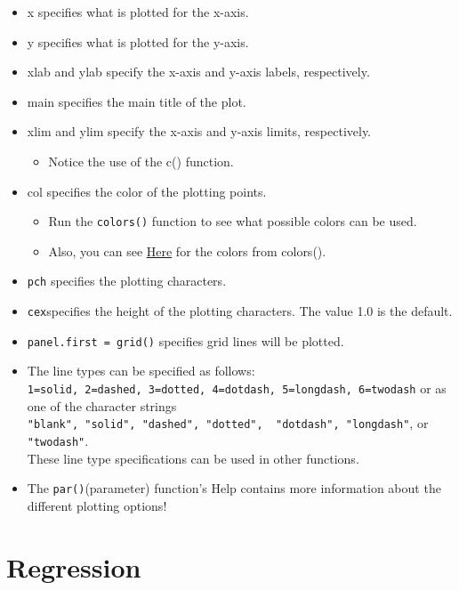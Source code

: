 \documentclass[
]{book}
\providecommand{\tightlist}{%
  \setlength{\itemsep}{0pt}\setlength{\parskip}{0pt}}
\begin{document}
\begin{itemize}
\item
  x specifies what is plotted for the x-axis.
\item
  y specifies what is plotted for the y-axis.
\item
  xlab and ylab specify the x-axis and y-axis labels, respectively.
\item
  main specifies the main title of the plot.
\item
  xlim and ylim specify the x-axis and y-axis limits, respectively.

  \begin{itemize}
  \tightlist
  \item
    Notice the use of the c() function.
  \end{itemize}
\item
  col specifies the color of the plotting points.

  \begin{itemize}
  \tightlist
  \item
    Run the \texttt{colors()} function to see what possible colors can be used.
  \item
    Also, you can see \href{https://github.com/EarlGlynn/colorchart/wiki/Color-Chart-in-R}{Here} for the colors from colors().
  \end{itemize}
\item
  \texttt{pch} specifies the plotting characters.
\item
  \texttt{cex}specifies the height of the plotting characters.
  The value 1.0 is the default.
\item
  \texttt{panel.first\ =\ grid()} specifies grid lines will be plotted.
\item
  The line types can be specified as follows:
  \texttt{1=solid,\ 2=dashed,\ 3=dotted,\ 4=dotdash,\ 5=longdash,\ 6=twodash} or as one of the character strings \texttt{"blank",\ "solid",\ "dashed",\ "dotted",\ \ "dotdash",\ "longdash"}, or \texttt{"twodash"}.\\
  These line type specifications can be used in other functions.\\
\item
  The \texttt{par()}(parameter) function's Help contains more information about the different plotting options!
\end{itemize}

\hypertarget{regression}{%
\section{Regression}\label{regression}}
\end{document}
